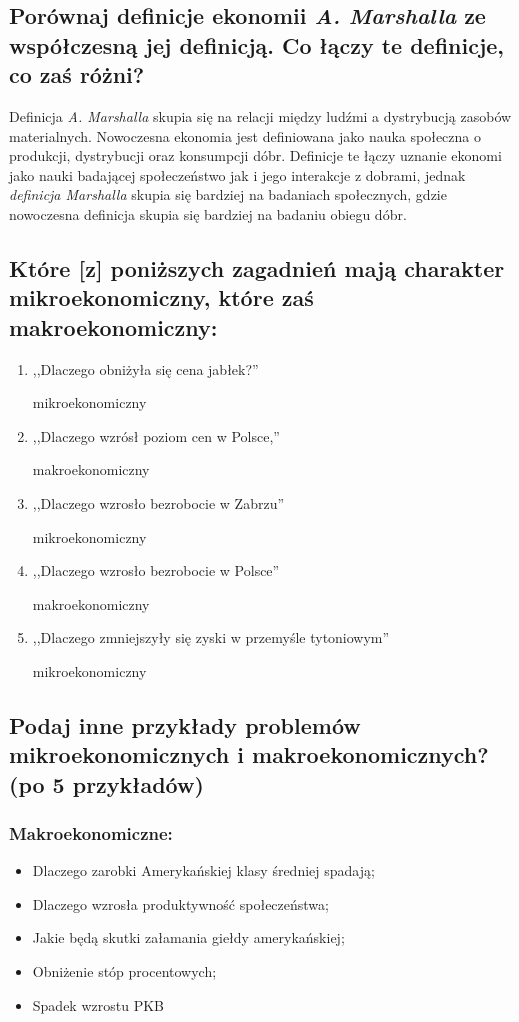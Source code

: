 \documentclass[a4paper,12pt]{article}
\begin{document}
\subsection{Porównaj definicje ekonomii \emph{A. Marshalla} ze współczesną jej definicją. Co łączy te definicje, co zaś różni?}

Definicja \emph{A. Marshalla} skupia się na relacji między ludźmi a dystrybucją zasobów materialnych. Nowoczesna ekonomia jest definiowana jako nauka społeczna o produkcji, dystrybucji oraz konsumpcji dóbr. Definicje te łączy uznanie ekonomi jako nauki badającej społeczeństwo jak i jego interakcje z dobrami, jednak \emph{definicja Marshalla} skupia się bardziej na badaniach społecznych, gdzie nowoczesna definicja skupia się bardziej na badaniu obiegu dóbr.

\subsection{Które [z] poniższych zagadnień mają charakter mikroekonomiczny, które zaś makroekonomiczny:}

\begin{enumerate}
	\item ,,Dlaczego obniżyła się cena jabłek?''

	      mikroekonomiczny

	\item ,,Dlaczego wzrósł poziom cen w Polsce,''

	      makroekonomiczny

	\item ,,Dlaczego wzrosło bezrobocie w Zabrzu''

	      mikroekonomiczny

	\item ,,Dlaczego wzrosło bezrobocie w Polsce''

	      makroekonomiczny

	\item ,,Dlaczego zmniejszyły się zyski w przemyśle tytoniowym''

	      mikroekonomiczny
\end{enumerate}

\subsection{Podaj inne przykłady problemów mikroekonomicznych i makroekonomicznych? (po 5 przykładów)}

\subsubsection*{Makroekonomiczne:}
\begin{itemize}
	\item Dlaczego zarobki Amerykańskiej klasy średniej spadają;
	\item Dlaczego wzrosła produktywność społeczeństwa;
	\item Jakie będą skutki załamania giełdy amerykańskiej;
	\item Obniżenie stóp procentowych;
	\item Spadek wzrostu PKB
\end{itemize}
\end{document}
